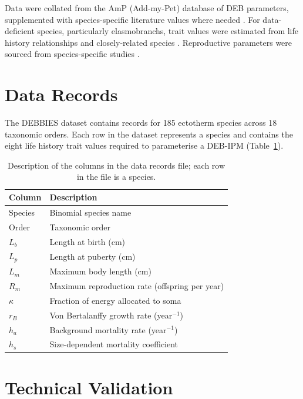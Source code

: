 \documentclass[11pt]{article}
\begin{document}
Data were collated from the AmP (Add-my-Pet) database of DEB parameters, supplemented with species-specific literature values where needed \citep{kooijman2019}. For data-deficient species, particularly elasmobranchs, trait values were estimated from life history relationships and closely-related species \citep{thorson2022, jabado2020, pardo2023, dulvy2016, smith1998, dulvy2004}. Reproductive parameters were sourced from species-specific studies \citep{guallart2001, natanson1986, simpfendorfer1998, lessa2001}.

\section{Data Records}

The DEBBIES dataset contains records for 185 ectotherm species across 18 taxonomic orders. Each row in the dataset represents a species and contains the eight life history trait values required to parameterise a DEB-IPM (Table~\ref{tab:columns}).

\begin{table}[htbp]
\centering
\caption{Description of the columns in the data records file; each row in the file is a species.}
\label{tab:columns}
\begin{tabular}{lp{8cm}}
\toprule
\textbf{Column} & \textbf{Description} \\
\midrule
Species & Binomial species name \\
Order & Taxonomic order \\
$L_b$ & Length at birth (cm) \\
$L_p$ & Length at puberty (cm) \\
$L_m$ & Maximum body length (cm) \\
$R_m$ & Maximum reproduction rate (offspring per year) \\
$\kappa$ & Fraction of energy allocated to soma \\
$r_B$ & Von Bertalanffy growth rate (year$^{-1}$) \\
$h_a$ & Background mortality rate (year$^{-1}$) \\
$h_s$ & Size-dependent mortality coefficient \\
\bottomrule
\end{tabular}
\end{table}

\section{Technical Validation}
\end{document}
